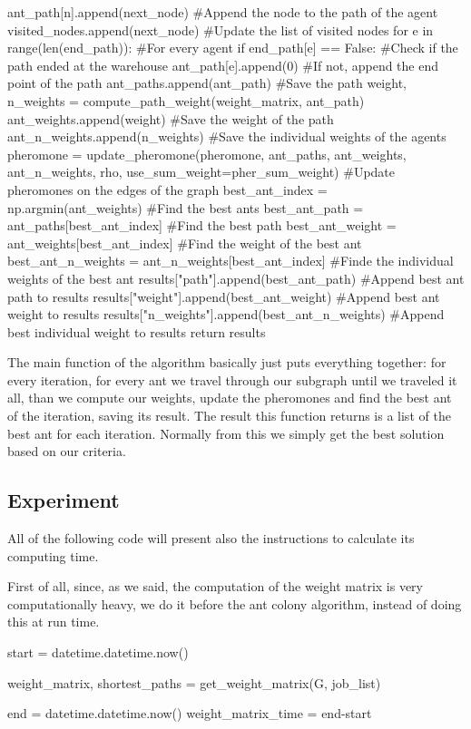 \documentclass[titlepage]{article}
\begin{document}
\begin{python}
                ant_path[n].append(next_node) #Append the node to the path of the agent
                visited_nodes.append(next_node) #Update the list of visited nodes
            for e in range(len(end_path)): #For every agent
                if end_path[e] == False: #Check if the path ended at the warehouse
                    ant_path[e].append(0) #If not, append the end point of the path
            ant_paths.append(ant_path) #Save the path
            weight, n_weights = compute_path_weight(weight_matrix, ant_path)
            ant_weights.append(weight) #Save the weight of the path
            ant_n_weights.append(n_weights) #Save the individual weights of the agents
        pheromone = update_pheromone(pheromone, ant_paths, ant_weights, ant_n_weights, rho, use_sum_weight=pher_sum_weight) #Update pheromones on the edges of the graph
        best_ant_index = np.argmin(ant_weights) #Find the best ants
        best_ant_path = ant_paths[best_ant_index] #Find the best path
        best_ant_weight = ant_weights[best_ant_index] #Find the weight of the best ant
        best_ant_n_weights = ant_n_weights[best_ant_index] #Finde the individual weights of the best ant
        results["path"].append(best_ant_path) #Append best ant path to results
        results["weight"].append(best_ant_weight) #Append best ant weight to results
        results["n_weights"].append(best_ant_n_weights) #Append best individual weight to results
    return results
\end{python}

The main function of the algorithm basically just puts everything together: for every iteration, for every ant we travel through our subgraph until we traveled it all, than we compute our weights, update the pheromones and find the best ant of the iteration, saving its result. The result this function returns is a list of the best ant for each iteration. Normally from this we simply get the best solution based on our criteria.

\subsection{Experiment}
All of the following code will present also the instructions to calculate its computing time.

First of all, since, as we said, the computation of the weight matrix is very computationally heavy, we do it before the ant colony algorithm, instead of doing this at run time.
\begin{python}
start = datetime.datetime.now()

weight_matrix, shortest_paths = get_weight_matrix(G, job_list)

end = datetime.datetime.now()
weight_matrix_time = end-start
\end{python}
\end{document}
